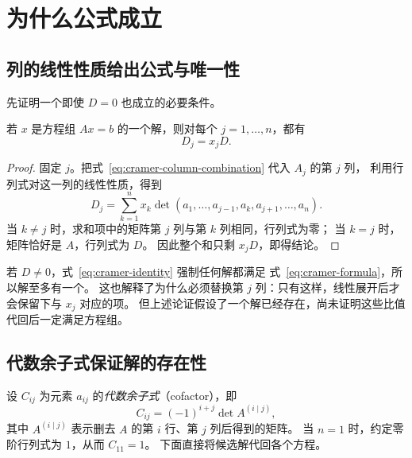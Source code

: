 \documentclass[UTF8,12pt,a4paper,fontset=fandol]{ctexart}
\begin{document}
\section{为什么公式成立}

\subsection{列的线性性质给出公式与唯一性}

先证明一个即使 $D=0$ 也成立的必要条件。

\begin{proposition}
\label{prop:cramer-necessary}
若 $x$ 是方程组 $Ax=b$ 的一个解，则对每个 $j=1,\ldots,n$，都有
\begin{equation}
  D_j=x_jD.
  \label{eq:cramer-identity}
\end{equation}
\end{proposition}

\begin{proof}
固定 $j$。把式~\eqref{eq:cramer-column-combination} 代入 $A_j$ 的第 $j$ 列，
利用行列式对这一列的线性性质，得到
\[
  D_j=\sum_{k=1}^n x_k
  \det(a_1,\ldots,a_{j-1},a_k,a_{j+1},\ldots,a_n).
\]
当 $k\ne j$ 时，求和项中的矩阵第 $j$ 列与第 $k$ 列相同，行列式为零；
当 $k=j$ 时，矩阵恰好是 $A$，行列式为 $D$。
因此整个和只剩 $x_jD$，即得结论。
\end{proof}

若 $D\ne0$，式~\eqref{eq:cramer-identity} 强制任何解都满足
式~\eqref{eq:cramer-formula}，所以解至多有一个。
这也解释了为什么必须替换第 $j$ 列：只有这样，线性展开后才会保留下与 $x_j$ 对应的项。
但上述论证假设了一个解已经存在，尚未证明这些比值代回后一定满足方程组。

\subsection{代数余子式保证解的存在性}

设 $C_{ij}$ 为元素 $a_{ij}$ 的\emph{代数余子式}（cofactor），即
\[
  C_{ij}=(-1)^{i+j}\det A^{(i\mid j)},
\]
其中 $A^{(i\mid j)}$ 表示删去 $A$ 的第 $i$ 行、第 $j$ 列后得到的矩阵。
当 $n=1$ 时，约定零阶行列式为 $1$，从而 $C_{11}=1$。
下面直接将候选解代回各个方程。
\end{document}
